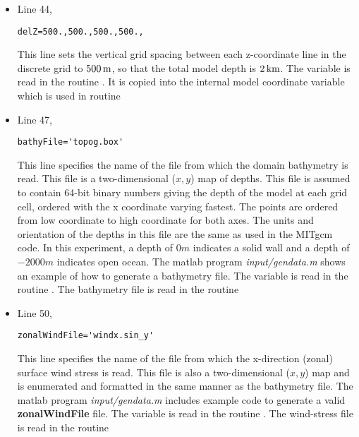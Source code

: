 \begin{itemize}

\item Line 44,
\begin{verbatim}
delZ=500.,500.,500.,500.,
\end{verbatim}
  This line sets the vertical grid spacing between each z-coordinate
  line in the discrete grid to $500\,{\rm m}$, so that the total model
  depth is $2\,{\rm km}$.  The variable  is read
  in the routine .  It is copied into
  the internal model coordinate variable  which is
  used in routine


\item Line 47,
\begin{verbatim}
bathyFile='topog.box'
\end{verbatim}
  This line specifies the name of the file from which the domain
  bathymetry is read. This file is a two-dimensional ($x,y$) map of
  depths. This file is assumed to contain 64-bit binary numbers giving
  the depth of the model at each grid cell, ordered with the x
  coordinate varying fastest. The points are ordered from low
  coordinate to high coordinate for both axes. The units and
  orientation of the depths in this file are the same as used in the
  MITgcm code. In this experiment, a depth of $0m$ indicates a solid
  wall and a depth of $-2000m$ indicates open ocean. The matlab
  program {\it input/gendata.m} shows an example of how to generate a
  bathymetry file.  The variable  is
  read in the routine .  The bathymetry
  file is read in the routine


\item Line 50,
\begin{verbatim}
zonalWindFile='windx.sin_y'
\end{verbatim}
  This line specifies the name of the file from which the x-direction
  (zonal) surface wind stress is read. This file is also a
  two-dimensional ($x,y$) map and is enumerated and formatted in the
  same manner as the bathymetry file. The matlab program {\it
    input/gendata.m} includes example code to generate a valid {\bf
    zonalWindFile} file.  The variable
   is read in the routine
  .  The wind-stress file is read in
  the routine


\end{itemize}
